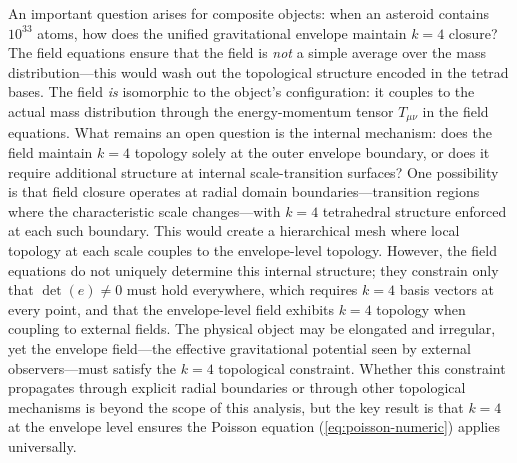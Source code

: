 
An important question arises for composite objects: when an asteroid contains $10^{33}$ atoms, how does the unified gravitational envelope maintain $k=4$ closure? The field equations ensure that the field is \emph{not} a simple average over the mass distribution—this would wash out the topological structure encoded in the tetrad bases. The field \emph{is} isomorphic to the object's configuration: it couples to the actual mass distribution through the energy-momentum tensor $T_{\mu\nu}$ in the field equations. What remains an open question is the internal mechanism: does the field maintain $k=4$ topology solely at the outer envelope boundary, or does it require additional structure at internal scale-transition surfaces? One possibility is that field closure operates at radial domain boundaries—transition regions where the characteristic scale changes—with $k=4$ tetrahedral structure enforced at each such boundary. This would create a hierarchical mesh where local topology at each scale couples to the envelope-level topology. However, the field equations do not uniquely determine this internal structure; they constrain only that $\det(e) \neq 0$ must hold everywhere, which requires $k=4$ basis vectors at every point, and that the envelope-level field exhibits $k=4$ topology when coupling to external fields. The physical object may be elongated and irregular, yet the envelope field—the effective gravitational potential seen by external observers—must satisfy the $k=4$ topological constraint. Whether this constraint propagates through explicit radial boundaries or through other topological mechanisms is beyond the scope of this analysis, but the key result is that $k=4$ at the envelope level ensures the Poisson equation (\ref{eq:poisson-numeric}) applies universally.
